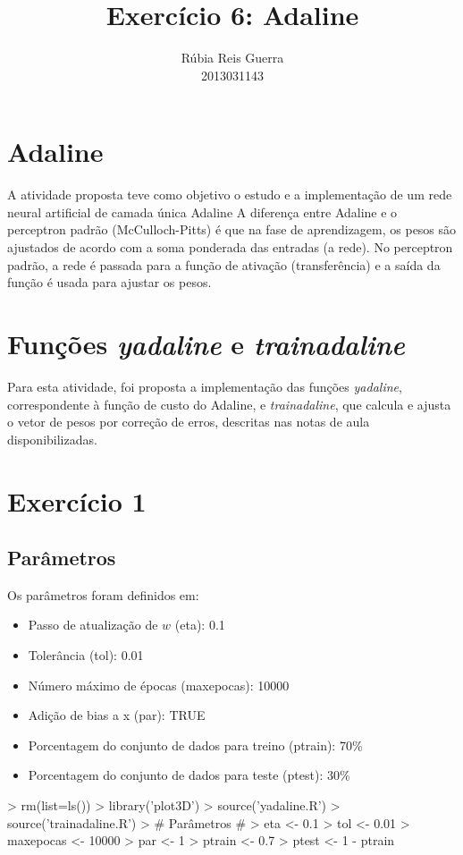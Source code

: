 \documentclass{article}
\title{Exercício 6: Adaline}
\author{Rúbia Reis Guerra \\ 2013031143}
\begin{document}

\maketitle

\section{Adaline}
A atividade proposta teve como objetivo o estudo e a implementação de um rede neural artificial de camada única Adaline A diferença entre Adaline e o perceptron padrão (McCulloch-Pitts) é que na fase de aprendizagem, os pesos são ajustados de acordo com a soma ponderada das entradas (a rede). No perceptron padrão, a rede é passada para a função de ativação (transferência) e a saída da função é usada para ajustar os pesos.

\section{Funções \textit{yadaline} e \textit{trainadaline}}
Para esta atividade, foi proposta a implementação das funções \textit{yadaline}, correspondente à função de custo do Adaline, e \textit{trainadaline}, que calcula e ajusta o vetor de pesos por correção de erros, descritas nas notas de aula disponibilizadas.

\section{Exercício 1}

\subsection{Parâmetros}
Os parâmetros foram definidos em:
\begin{itemize}
\item Passo de atualização de $w$ (eta): 0.1
\item Tolerância (tol): 0.01
\item Número máximo de épocas (maxepocas): 10000
\item Adição de bias a x (par): TRUE
\item Porcentagem do conjunto de dados para treino (ptrain): 70\%
\item Porcentagem do conjunto de dados para teste (ptest): 30\%
\end{itemize}
\begin{Schunk}
\begin{Sinput}
> rm(list=ls())
> library('plot3D')
> source('yadaline.R')
> source('trainadaline.R')
> # Parâmetros #
> eta <- 0.1
> tol <- 0.01
> maxepocas <- 10000
> par <- 1
> ptrain <- 0.7
> ptest <- 1 - ptrain
\end{Sinput}
\end{Schunk}
\end{document}
